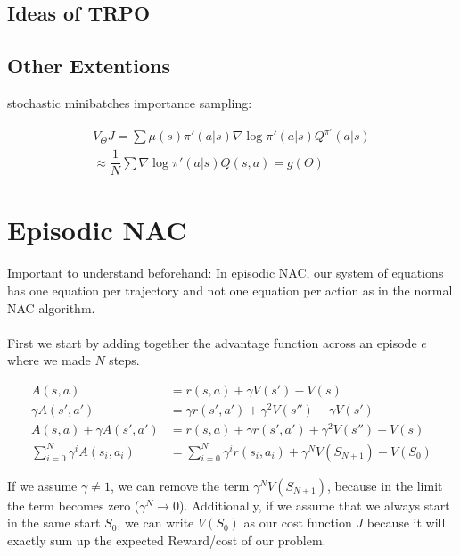 \subsection{Ideas of TRPO}


\subsection{Other Extentions}

\begin{itemize}
	\x stochastic
	\x minibatches
	\x importance sampling:
\end{itemize}

\begin{align}
	V_{\Theta} J = \sum \mu(s) \pi'(a|s) \nabla \log \pi'(a|s) Q^{\pi'}(a|s) \\
	\approx \dfrac{1}{N} \sum \nabla \log \pi'(a|s) Q(s,a) = g(\Theta)
\end{align}





\section{Episodic NAC}
Important to understand beforehand: In episodic NAC, our system of equations has one equation per trajectory and not one equation per action as in the normal NAC algorithm.
\\\\
First we start by adding together the advantage function across an episode $e$ where we made $N$ steps.

\begin{align}
	A(s,a) &= r(s,a) + \gamma V(s') - V(s) \\
	\gamma A(s',a') &= \gamma r(s', a') + \gamma^2V(s'') - \gamma V(s') \\
	A(s, a) + \gamma A(s', a') &= r(s,a) + \gamma r(s',a') + \gamma^2 V(s'') - V(s) \\
	\sum_{i = 0}^{N}\gamma^i A(s_i, a_i) &= \sum_{i = 0}^{N}\gamma^i r(s_i, a_i) + \gamma^N V(S_{N+1}) - V(S_0)
\end{align}

\noindent If we assume $\gamma \neq 1$, we can remove the term $\gamma^N V(S_{N+1})$, because in the limit the term becomes zero ($\gamma^N \rightarrow 0$). Additionally, if we assume that we always start in the same start $S_0$, we can write $V(S_0)$ as our cost function $J$ because it will exactly sum up the expected Reward/cost of our problem.

